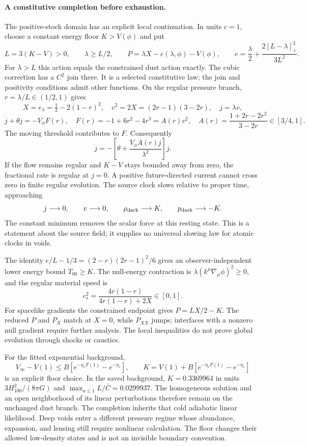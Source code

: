 \paragraph{A constitutive completion before exhaustion.}
\label{sec:depletioncompletion}
The positive-stock domain has an explicit local continuation. In units
$c=1$, choose a constant energy floor $K>V(\phi)$ and put
\[
L=3(K-V)>0,\qquad \lambda\ge L/2,\qquad
P=\lambda X-e(\lambda,\phi)-V(\phi),\qquad
e=\frac\lambda2+\frac{2[L-\lambda]_+^3}{3L^2}.
\]
For $\lambda>L$ this action equals the constrained dust action exactly.
The cubic correction has a $C^2$ join there. It is a selected constitutive
law; the join and positivity conditions admit other functions. On the
regular pressure branch, $r=\lambda/L\in(1/2,1)$ gives
\[
X=e_\lambda=\tfrac12-2(1-r)^2,\quad
v^2=2X=(2r-1)(3-2r),\quad j=\lambda v,
\]
\[
\dot j+\theta j=-V_\phi F(r),\quad
F(r)=-1+6r^2-4r^3=A(r)v^2,\quad
A(r)=\frac{1+2r-2r^2}{3-2r}\in[3/4,1].
\]
The moving threshold contributes to $F$. Consequently
\[
\dot j=-\left[\theta+\frac{V_\phi A(r)j}{\lambda^2}\right]j.
\]
If the flow remains regular and $K-V$ stays bounded away from zero, the
fractional rate is regular at $j=0$. A positive future-directed current
cannot cross zero in finite regular evolution. The source clock slows
relative to proper time, approaching
\[
j\longrightarrow0,\qquad v\longrightarrow0,\qquad
\rho_{\rm dark}\longrightarrow K,\qquad p_{\rm dark}\longrightarrow-K.
\]
The constant minimum removes the scalar force at this resting state.
This is a statement about the source field; it supplies no universal
slowing law for atomic clocks in voids.

The identity $e/L-1/3=(2-r)(2r-1)^2/6$ gives an observer-independent
lower energy bound $T_{00}\ge K$. The null-energy contraction is
$\lambda(k^\mu\nabla_\mu\phi)^2\ge0$, and the regular material speed is
\[
c_s^2=\frac{4r(1-r)}{4r(1-r)+2X}\in[0,1].
\]
For spacelike gradients the constrained endpoint gives $P=LX/2-K$.
The reduced $P$ and $P_X$ match at $X=0$, while $P_{XX}$ jumps; interfaces
with a nonzero null gradient require further analysis. The local
inequalities do not prove global evolution through shocks or caustics.

For the fitted exponential background,
\[
V_\infty-V(1)\le B[e^{-\eta_*F(1)}-e^{-\eta_*}],\qquad
K=V(1)+B[e^{-\eta_*F(1)}-e^{-\eta_*}]
\]
is an explicit floor choice. In the saved background, $K=0.3369964$ in
units $3H_{100}^2/(8\pi G)$ and $\max_{a\le1}L/\bar C=0.0299937$.
The homogeneous solution and an open neighborhood of its linear
perturbations therefore remain on the unchanged dust branch. The
completion inherits that cold adiabatic linear likelihood. Deep voids
enter a different pressure regime whose abundance, expansion, and
lensing still require nonlinear calculation. The floor changes their
allowed low-density states and is not an invisible boundary convention.

